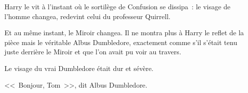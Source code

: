 Harry le vit à l'instant où le sortilège de Confusion se dissipa~: le visage de l'homme changea, redevint celui du professeur Quirrell.

Et au même instant, le Miroir changea. Il ne montra plus à Harry le reflet de la pièce mais le véritable Albus Dumbledore, exactement comme s'il s'était tenu juste derrière le Miroir et que l'on avait pu voir au travers.

Le visage du vrai Dumbledore était dur et sévère.

<<~Bonjour, Tom~>>, dit Albus Dumbledore.

